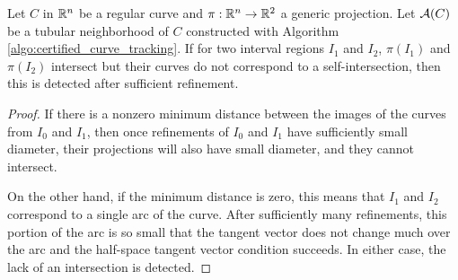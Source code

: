 
\begin{lemma}
    Let $C$ in ${\mathbb R}^n$ be a regular curve and $\pi: {\mathbb R}^n \to {\mathbb R}^2$ a generic projection. Let ${\mathcal A}(C)$ be a tubular neighborhood of $C$ constructed with Algorithm \ref{algo:certified_curve_tracking}.  If for two interval regions $I_1$ and $I_2$, $\pi(I_1)$ and $\pi(I_2)$ intersect but their curves do not correspond to a self-intersection, then this is detected after sufficient refinement.
\end{lemma}
    
    
    

\begin{proof}
    If there is a nonzero minimum distance between the images of the curves from $I_0$ and $I_1$, then once refinements of $I_0$ and $I_1$ have sufficiently small diameter, their projections will also have small diameter, and they cannot intersect.

    On the other hand, if the minimum distance is zero, this means that $I_1$ and $I_2$ correspond to a single arc of the curve.  After sufficiently many refinements, this portion of the arc is so small that the tangent vector does not change much over the arc and the half-space tangent vector condition succeeds.  In either case, the lack of an intersection is detected.
\end{proof}

    
